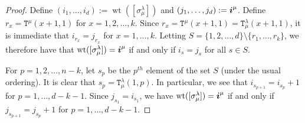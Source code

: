 \documentclass[twoside,11pt,reqno,letter]{amsart}
\numberwithin{equation}{section}
\theoremstyle{definition}  %
\def\bi{\text{\boldmath$i$}}
\newcommand{\res}{\operatorname{res}}
\newcommand{\0}{{\bar 0}}
\newcommand{\1}{{\bar 1}}
\newcommand{\la}{\lambda}
\newcommand{\si}{\sigma}
\def\T{{\mathtt T}}
\def\wt{{\operatorname{wt}}}
\begin{document}
{\begin{proof}
   








  Define $(i_1, \dots, i_d) := \wt([\si^\la_\mu])$ and $(j_1, \dots, j_d) := \bi^\mu$. Define $r_x = \T^\mu(x+1,1)$ for $x = 1, 2, \dots, k$. Since $r_x = \T^\mu(x+1,1) = \T^\la_\mu(x+1,1)$, it is immediate that $i_{r_x} = j_{r_x}$ for $x = 1, \dots, k$. Letting $S = \{1, 2, \dots, d\} \setminus \{r_1, \dots, r_k\}$, we therefore have that $\wt([\si^\la_\mu]) = \bi^\mu$ if and only if $i_s = j_s$ for all $s \in S$.
  
  For $p = 1, 2, \dots, n-k$, let $s_p$ be the $p^{th}$ element of the set $S$ (under the usual ordering). It is clear that $s_p = \T^\la_\mu(1,p)$. In particular, we see that $i_{s_{p+1}} = i_{s_p} + 1$ for $p = 1, \dots, d-k-1$. Since $j_{s_1} = i_{s_1}$, we have $\wt([\si^\la_\mu]) = \bi^\mu$ if and only if $j_{s_{p+1}} = j_{s_p} + 1$ for $p = 1, \dots, d-k-1$.


\end{proof}}
\end{document}
